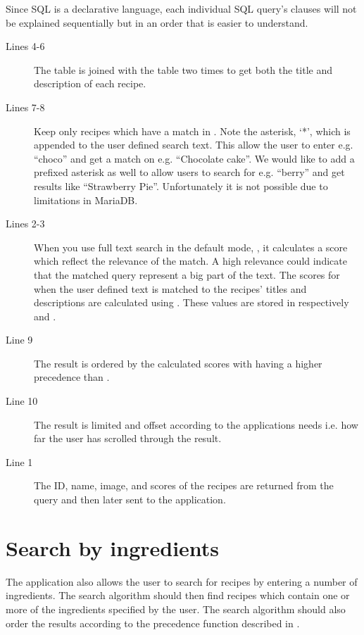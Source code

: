 Since SQL is a declarative language, each individual SQL query's clauses will not be explained sequentially but in an order that is easier to understand.
\begin{description}
\item[Lines 4-6] The  table is joined with the  table two times to get both the title and description of each recipe.
\item[Lines 7-8] Keep only recipes which have a match in . Note the asterisk, `*', which is appended to the user defined search text. This allow the user to enter e.g. ``choco'' and get a match on e.g. ``Chocolate cake''. We would like to add a prefixed asterisk as well to allow users to search for e.g. ``berry'' and get results like ``Strawberry Pie''. Unfortunately it is not possible due to limitations in MariaDB.\cite{mariafulltext}
\item[Lines 2-3] When you use full text search in the default mode, \linebreak{}, it calculates a score which reflect the relevance of the match. A high relevance could indicate that the matched query represent a big part of the text. The scores for when the user defined text is matched to the recipes' titles and descriptions are calculated using . These values are stored in respectively  and .
\item[Line 9] The result is ordered by the calculated scores with  having a higher precedence than .
\item[Line 10] The result is limited and offset according to the applications needs i.e. how far the user has scrolled through the result.
\item[Line 1] The ID, name, image, and scores of the recipes are returned from the query and then later sent to the application.
\end{description}



\section{Search by ingredients}
The application also allows the user to search for recipes by entering a number of ingredients. The search algorithm should then find recipes which contain one or more of the ingredients specified by the user. The search algorithm should also order the results according to the precedence function described in .

